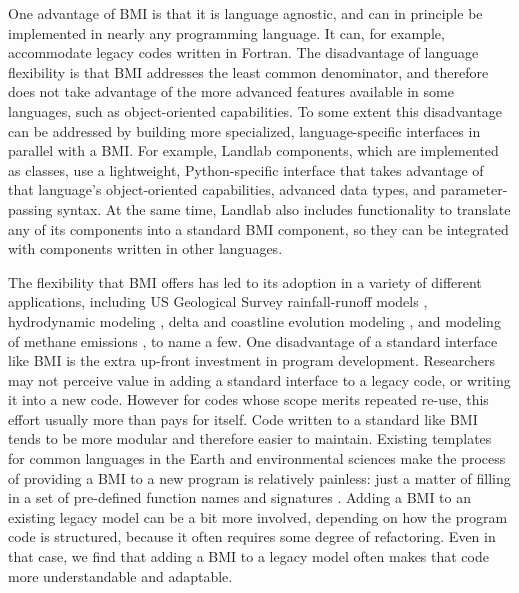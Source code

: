 \documentclass[journal abbreviation, manuscript]{copernicus}
\begin{document}
One advantage of BMI is that it is language agnostic, and can in principle be implemented in nearly any programming language. It can, for example, accommodate legacy codes written in Fortran. The disadvantage of language flexibility is that BMI addresses the least common denominator, and therefore does not take advantage of the more advanced features available in some languages, such as object-oriented capabilities. To some extent this disadvantage can be addressed by building more specialized, language-specific interfaces in parallel with a BMI. For example, Landlab components, which are implemented as classes, use a lightweight, Python-specific interface that takes advantage of that language's object-oriented capabilities, advanced data types, and parameter-passing syntax. At the same time, Landlab also includes functionality to translate any of its components into a standard BMI component, so they can be integrated with components written in other languages.

The flexibility that BMI offers has led to its adoption in a variety of different applications, including US Geological Survey rainfall-runoff models \citep{markstrom2015prms,regan2018description,regan2019us}, hydrodynamic modeling \citep[including flagship models developed by Deltares and the Netherlands eScience Center,][]{hoch2019advancing,hoch2019evaluating}, delta and coastline evolution modeling \citep{ratliff2018exploring}, and modeling of methane emissions \citep{fox2020agent}, to name a few. One disadvantage of a standard interface like BMI is the extra up-front investment in program development. Researchers may not perceive value in adding a standard interface to a legacy code, or writing it into a new code. However for codes whose scope merits repeated re-use, this effort usually more than pays for itself. Code written to a standard like BMI tends to be more modular and therefore easier to maintain. Existing templates for common languages in the Earth and environmental sciences make the process of providing a BMI to a new program is relatively painless: just a matter of filling in a set of pre-defined function names and signatures \citep{hutton2020basic}. Adding a BMI to an existing legacy model can be a bit more involved, depending on how the program code is structured, because it often requires some degree of refactoring. Even in that case, we find that adding a BMI to a legacy model often makes that code more understandable and adaptable.
\end{document}
